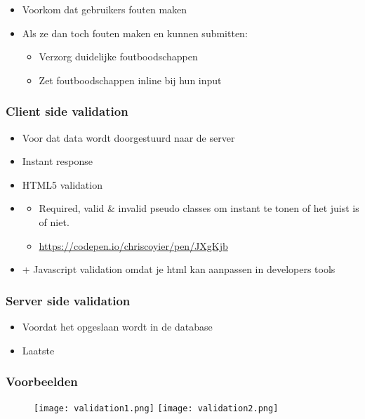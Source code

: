 \documentclass{article}
\begin{document}
\begin{itemize}
    \item Voorkom dat gebruikers fouten maken
    \item Als ze dan toch fouten maken en kunnen submitten:
    \begin{itemize}
        \item Verzorg duidelijke foutboodschappen
        \item Zet foutboodschappen inline bij hun input
    \end{itemize} 
\end{itemize}

\subsubsection{Client side validation}
\begin{itemize}
    \item Voor dat data wordt doorgestuurd naar de server
    \item Instant response
    \item HTML5 validation
    \item \begin{itemize}
        \item Required, valid \& invalid pseudo classes om instant te tonen of het juist is of niet.
        \item \url{https://codepen.io/chriscoyier/pen/JXgKjb}
    \end{itemize}
    \item + Javascript validation omdat je html kan aanpassen in developers tools
\end{itemize}

\subsubsection{Server side validation}
\begin{itemize}
    \item Voordat het opgeslaan wordt in de database
    \item Laatste
\end{itemize}

\subsubsection{Voorbeelden}
\begin{figure}[H]
    \centering
    \texttt{[image: validation1.png]}
    \texttt{[image: validation2.png]}
    \caption{}
\end{figure}
\end{document}
